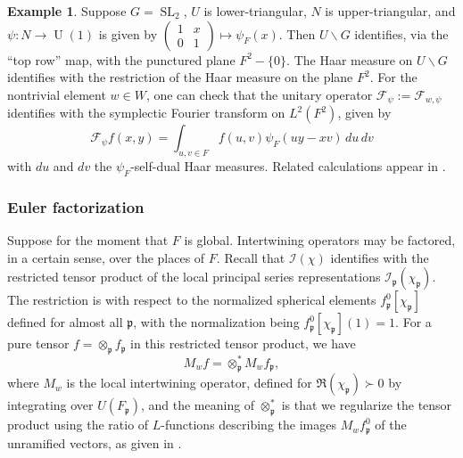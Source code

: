 \documentclass[reqno]{amsart}
\DeclareMathOperator{\SL}{SL}
\DeclareMathOperator{\U}{U}
\theoremstyle{plain} \newtheorem{theorem} {Theorem}
\theoremstyle{definition} \newtheorem{definition} [theorem] {Definition}
\newtheorem{example} [theorem] {Example}
\theoremstyle{itplain} %
\numberwithin{equation}{section}
\numberwithin{theorem}{section}
\begin{document}
\begin{example}
  Suppose $G = \SL_2$, $U$ is lower-triangular, $N$ is upper-triangular, and $\psi : N \rightarrow \U(1)$ is given by $\begin{pmatrix}
    1 & x \\
    0  & 1
  \end{pmatrix} \mapsto \psi_F(x)$. Then $U \backslash G$ identifies, via the ``top row'' map, with the punctured plane $F^2 - \{0\}$.  The Haar measure on $U \backslash G$ identifies with the restriction of the Haar measure on the plane $F^2$.  For the nontrivial element $w \in W$, one can check that the unitary operator $\mathcal{F}_{\psi} := \mathcal{F}_{w,\psi}$ identifies with the symplectic Fourier transform on $L^2(F^2)$, given by
  \begin{equation*}
    \mathcal{F}_{\psi} f(x,y) =
    \int _{u, v \in F}
    f(u, v) \psi_F(u y - x v) 
    \, d u \, d v
  \end{equation*}
  with $d u$ and $d v$ the $\psi_F$-self-dual Haar measures.  Related calculations appear in \cite[\S3.4--\S3.6]{MR3468638}.
\end{example}


\subsubsection{Euler factorization}\label{sec:fact-intertw-oper}
Suppose for the moment that $F$ is global.  Intertwining operators may be factored, in a certain sense, over the places of $F$.  Recall that $\mathcal{I}(\chi)$ identifies with the restricted tensor product of the local principal series representations $\mathcal{I}_\mathfrak{p}(\chi_\mathfrak{p})$.  The restriction is with respect to the normalized spherical elements $f_\mathfrak{p}^0[\chi_\mathfrak{p}]$ defined for almost all $\mathfrak{p}$, with the normalization being $f_\mathfrak{p}^0[\chi_\mathfrak{p}](1) = 1$.  For a pure tensor $f = \otimes_\mathfrak{p} f_\mathfrak{p}$ in this restricted tensor product, we have
\begin{equation*}
  M_w f = \otimes_\mathfrak{p} ^* M_w f_\mathfrak{p},
\end{equation*}
where $M_w$ is the local intertwining operator, defined  for $\Re(\chi_\mathfrak{p}) \succ 0$ by integrating over $U(F_\mathfrak{p})$, and the meaning of $\otimes_\mathfrak{p}^*$ is that we regularize the tensor product using the ratio of $L$-functions describing the images $M_w f_\mathfrak{p}^0$ of the unramified vectors, as given in \cite[(4)]{MR0419366}.
\end{document}
